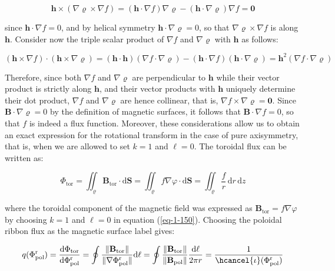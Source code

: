 \begin{equation}
    \mathbf{h}\times(\nabla\varrho\times\nabla f)=(\mathbf{h}\cdot\nabla f)\nabla\varrho-(\mathbf{h}\cdot\nabla\varrho)\nabla f=\mathbf{0}
\end{equation}

since $\mathbf{h}\cdot\nabla f=0$, and by helical symmetry $\mathbf{h}\cdot\nabla\varrho=0$, so that $\nabla\varrho\times\nabla f$ is along $\mathbf{h}$. Consider now the triple scalar product of $\nabla f$ and $\nabla\varrho$ with $\mathbf{h}$ as follows:

\begin{equation}
    (\mathbf{h}\times\nabla f)\cdot(\mathbf{h}\times\nabla\varrho)=(\mathbf{h}\cdot\mathbf{h})(\nabla f\cdot\nabla\varrho)-(\mathbf{h}\cdot\nabla f)(\mathbf{h}\cdot\nabla\varrho)=\mathbf{h}^2(\nabla f\cdot\nabla\varrho)
\end{equation}

Therefore, since both $\nabla f$ and $\nabla\varrho$ are perpendicular to $\mathbf{h}$ while their vector product is strictly along $\mathbf{h}$, and their vector products with $\mathbf{h}$ uniquely determine their dot product, $\nabla f$ and $\nabla\varrho$ are hence collinear, that is, $\nabla f\times\nabla\varrho=\mathbf{0}$. Since $\mathbf{B}\cdot\nabla\varrho=0$ by the definition of magnetic surfaces, it follows that $\mathbf{B}\cdot\nabla f=0$, so that $f$ is indeed a flux function. Moreover, these considerations allow us to obtain an exact expression for the rotational transform in the case of pure axisymmetry, that is, when we are allowed to set $k=1$ and $\ell=0$. The toroidal flux can be written as:

\begin{equation}
    \Phi_\text{tor}=\iint_{\varrho}\mathbf{B}_\text{tor}\cdot\mathrm{d}\mathbf{S}=\iint_{\varrho}f\nabla\varphi\cdot\mathrm{d}\mathbf{S}=\iint_{\varrho}\frac{f}{r}\,\mathrm{d}r\,\mathrm{d}z
\end{equation}

where the toroidal component of the magnetic field was expressed as $\mathbf{B}_\text{tor}=f\nabla\varphi$ by choosing $k=1$ and $\ell=0$ in equation (\ref{eq-1-150}). Choosing the poloidal ribbon flux as the magnetic surface label gives:

\begin{equation}
    q(\Phi_\text{pol}^\text{r})=\frac{\mathrm{d}\Phi_\text{tor}}{\mathrm{d}\Phi_\text{pol}^\text{r}}=\oint\frac{\|\mathbf{B}_\text{tor}\|}{\|\nabla\Phi_\text{pol}^\text{r}\|}\mathrm{d}\ell=\oint\frac{\|\mathbf{B}_\text{tor}\|}{\|\mathbf{B}_\text{pol}\|}\frac{\mathrm{d}\ell}{2\pi r}=\frac{1}{\hcancel{\iota}(\Phi_{\text{pol}}^\text{r})}
\end{equation}

